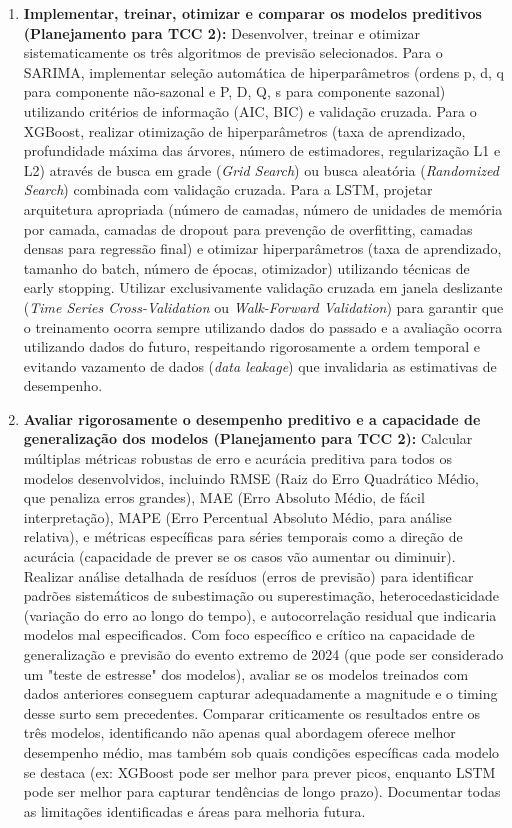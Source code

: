\begin{enumerate}
    \item \textbf{Implementar, treinar, otimizar e comparar os modelos preditivos (Planejamento para TCC 2):} Desenvolver, treinar e otimizar sistematicamente os três algoritmos de previsão selecionados. Para o SARIMA, implementar seleção automática de hiperparâmetros (ordens p, d, q para componente não-sazonal e P, D, Q, s para componente sazonal) utilizando critérios de informação (AIC, BIC) e validação cruzada. Para o XGBoost, realizar otimização de hiperparâmetros (taxa de aprendizado, profundidade máxima das árvores, número de estimadores, regularização L1 e L2) através de busca em grade (\textit{Grid Search}) ou busca aleatória (\textit{Randomized Search}) combinada com validação cruzada. Para a LSTM, projetar arquitetura apropriada (número de camadas, número de unidades de memória por camada, camadas de dropout para prevenção de overfitting, camadas densas para regressão final) e otimizar hiperparâmetros (taxa de aprendizado, tamanho do batch, número de épocas, otimizador) utilizando técnicas de early stopping. Utilizar exclusivamente validação cruzada em janela deslizante (\textit{Time Series Cross-Validation} ou \textit{Walk-Forward Validation}) para garantir que o treinamento ocorra sempre utilizando dados do passado e a avaliação ocorra utilizando dados do futuro, respeitando rigorosamente a ordem temporal e evitando vazamento de dados (\textit{data leakage}) que invalidaria as estimativas de desempenho.
    
    \item \textbf{Avaliar rigorosamente o desempenho preditivo e a capacidade de generalização dos modelos (Planejamento para TCC 2):} Calcular múltiplas métricas robustas de erro e acurácia preditiva para todos os modelos desenvolvidos, incluindo RMSE (Raiz do Erro Quadrático Médio, que penaliza erros grandes), MAE (Erro Absoluto Médio, de fácil interpretação), MAPE (Erro Percentual Absoluto Médio, para análise relativa), e métricas específicas para séries temporais como a direção de acurácia (capacidade de prever se os casos vão aumentar ou diminuir). Realizar análise detalhada de resíduos (erros de previsão) para identificar padrões sistemáticos de subestimação ou superestimação, heterocedasticidade (variação do erro ao longo do tempo), e autocorrelação residual que indicaria modelos mal especificados. Com foco específico e crítico na capacidade de generalização e previsão do evento extremo de 2024 (que pode ser considerado um "teste de estresse" dos modelos), avaliar se os modelos treinados com dados anteriores conseguem capturar adequadamente a magnitude e o timing desse surto sem precedentes. Comparar criticamente os resultados entre os três modelos, identificando não apenas qual abordagem oferece melhor desempenho médio, mas também sob quais condições específicas cada modelo se destaca (ex: XGBoost pode ser melhor para prever picos, enquanto LSTM pode ser melhor para capturar tendências de longo prazo). Documentar todas as limitações identificadas e áreas para melhoria futura.
\end{enumerate}

